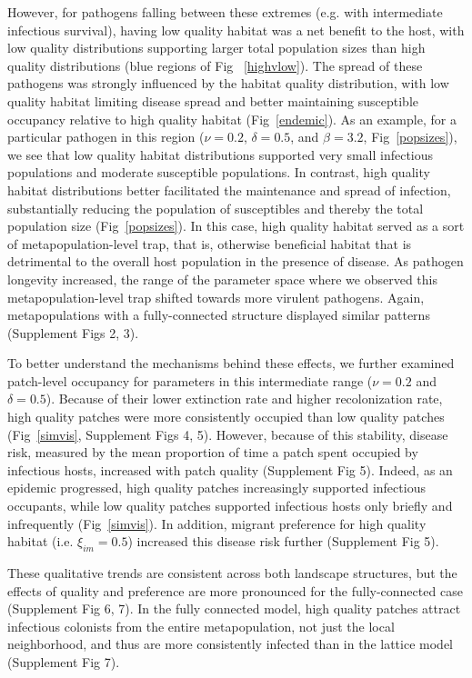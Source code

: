 \documentclass{article}
\begin{document}
However, for pathogens falling between these extremes (e.g. with intermediate infectious survival), having low quality habitat was a net benefit to the host, with low quality distributions supporting larger total population sizes than high quality distributions (blue regions of Fig ~\ref{highvlow}).
The spread of these pathogens was strongly influenced by the habitat quality distribution, with low quality habitat limiting disease spread and better maintaining susceptible occupancy relative to high quality habitat (Fig~\ref{endemic}).
As an example, for a particular pathogen in this region ($\nu = 0.2$, $\delta = 0.5$, and $\beta = 3.2$, Fig~\ref{popsizes}), we see that low quality habitat distributions supported very small infectious populations and moderate susceptible populations.
In contrast, high quality habitat distributions better facilitated the maintenance and spread of infection, substantially reducing the population of susceptibles and thereby the total population size (Fig~\ref{popsizes}).
In this case, high quality habitat served as a sort of metapopulation-level trap, that is, otherwise beneficial habitat that is detrimental to the overall host population in the presence of disease.
As pathogen longevity increased, the range of the parameter space where we observed this metapopulation-level trap shifted towards more virulent pathogens.
Again, metapopulations with a fully-connected structure displayed similar patterns (Supplement Figs 2, 3).

To better understand the mechanisms behind these effects, we further examined patch-level occupancy for parameters in this intermediate range ($\nu = 0.2$ and $\delta = 0.5$).  
Because of their lower extinction rate and higher recolonization rate, high quality patches were more consistently occupied than low quality patches (Fig~\ref{simvis}, Supplement Figs 4, 5).  
However, because of this stability, disease risk, measured by the mean proportion of time a patch spent occupied by infectious hosts, increased with patch quality (Supplement Fig 5).
Indeed, as an epidemic progressed, high quality patches increasingly supported infectious occupants, while low quality patches supported infectious hosts only briefly and infrequently (Fig~\ref{simvis}).  
In addition, migrant preference for high quality habitat (i.e. $\xi_{im} = 0.5$) increased this disease risk further (Supplement Fig 5).

These qualitative trends are consistent across both landscape structures, but the effects of quality and preference are more pronounced for the fully-connected case (Supplement Fig 6, 7).
In the fully connected model, high quality patches attract infectious colonists from the entire metapopulation, not just the local neighborhood, and thus are more consistently infected than in the lattice model (Supplement Fig 7).
\end{document}
